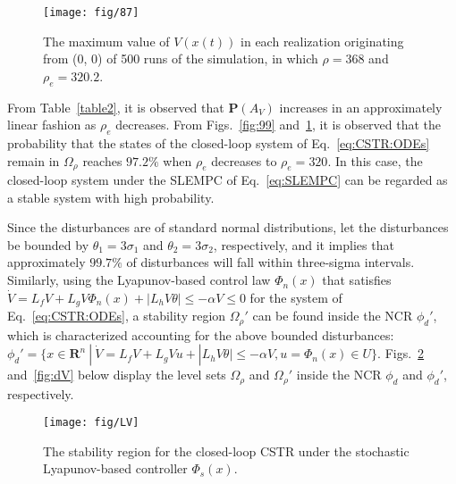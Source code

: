 \documentclass[letterpaper, 10pt, conference]{ieeeconf}
\begin{document}
\begin{figure}[!htbp]
	\centering
	\texttt{[image: fig/87]}
	\vspace{-8pt}
	\caption{The maximum value of ${V(x(t))}$ in each realization originating from (0, 0) of 500 runs of the simulation, in which $\rho=368$ and $\rho_{e}=320.2$.}
	\label{fig:87}
	\vspace{-6pt}
\end{figure}



From Table~\ref{table2}, it is observed that $\mathbf{P}(A_V)$ increases in an approximately linear fashion as $\rho_{e}$ decreases. From Figs.~\ref{fig:99} and~\ref{fig:87}, it is observed that the probability that the states of the closed-loop system of Eq.~\ref{eq:CSTR:ODEs} remain in $\Omega_{\rho}$ reaches $97.2 \%$ when $\rho_{e}$ decreases to $\rho_{e}=320$. In this case, the closed-loop system under the SLEMPC of Eq.~\ref{eq:SLEMPC} can be regarded as a stable system with high probability.

Since the disturbances are of standard normal distributions, let the disturbances be bounded by $\theta_1=3 \sigma_1$ and $\theta_2=3 \sigma_2$, respectively, and it implies that approximately $99.7 \%$ of disturbances will fall within three-sigma intervals. Similarly, using the Lyapunov-based control law $\Phi_n(x)$ that satisfies $\dot{V}=L_fV+L_gV \Phi_n(x) +|L_hV \theta| \leq -\alpha V \leq 0$ for the system of Eq.~\ref{eq:CSTR:ODEs}, a stability region $\Omega_\rho'$ can be found inside the NCR $\phi_d'$, which is characterized accounting for the above bounded disturbances: $\phi_d'=\{ x \in \mathbf{R}^n ~|~ \dot{V}=L_fV+L_gVu+|L_hV \theta|  \leq -\alpha V, u=\Phi_n(x)  \in U  \}$. Figs.~\ref{fig:LV} and~\ref{fig:dV} below display the level sets $\Omega_{\rho}$ and $\Omega_\rho'$ inside the NCR $\phi_d$ and $\phi_d'$, respectively.





\begin{figure}[!htbp]
	\centering
	\texttt{[image: fig/LV]}
	\vspace{-8pt}
	\caption{The stability region for the closed-loop CSTR under the stochastic Lyapunov-based controller $\Phi_s(x)$.}
	\label{fig:LV}
	\vspace{-6pt}
\end{figure}
\end{document}
